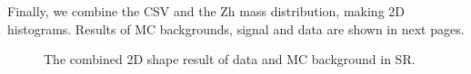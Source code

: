 Finally, we combine the CSV and the Zh mass distribution, making 2D histograms. Results of MC backgrounds, signal and data are shown in next pages.

\begin{figure}[hbtp]
  \centering
  \hspace{0.5cm}
  \caption{\label{fig:h2_bkg_data}The combined 2D shape result of data and MC background in SR.}
\end{figure}

